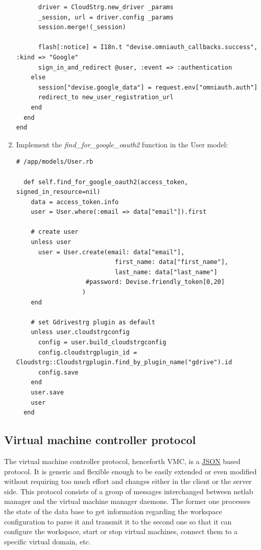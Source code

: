\documentclass{article}
\begin{document}
\begin{enumerate}
\begin{verbatim}
      driver = CloudStrg.new_driver _params
      _session, url = driver.config _params
      session.merge!(_session)
      
      flash[:notice] = I18n.t "devise.omniauth_callbacks.success", :kind => "Google"
      sign_in_and_redirect @user, :event => :authentication
    else
      session["devise.google_data"] = request.env["omniauth.auth"]
      redirect_to new_user_registration_url
    end
  end
end
\end{verbatim}

\item Implement the \textit{find\_for\_google\_oauth2} function in the User model:
\begin{verbatim}
# /app/models/User.rb

  def self.find_for_google_oauth2(access_token, signed_in_resource=nil)
    data = access_token.info
    user = User.where(:email => data["email"]).first

    # create user
    unless user
      user = User.create(email: data["email"],
                           first_name: data["first_name"],
                           last_name: data["last_name"]
	    		   #password: Devise.friendly_token[0,20]
	    		  )
    end

    # set Gdrivestrg plugin as default
    unless user.cloudstrgconfig
      config = user.build_cloudstrgconfig
      config.cloudstrgplugin_id = Cloudstrg::Cloudstrgplugin.find_by_plugin_name("gdrive").id
      config.save
    end
    user.save
    user
  end
\end{verbatim}
\end{enumerate}
 

\subsection{Virtual machine controller protocol}
\label{sub:VMC}
The virtual machine controller protocol, henceforth VMC, is a \href{http://www.json.org/}{JSON} based protocol. It is generic and flexible enough to be easily extended or even modified without requiring too much effort and changes either in the client or the server side. This protocol consists of a group of messages interchanged between netlab manager and the virtual machine manager daemons. The former one processes the state of the data base to get information regarding the workspace configuration to parse it and transmit it to the second one so that it can configure the workspace, start or stop virtual machines, connect them to a specific virtual domain, etc.
\end{document}
